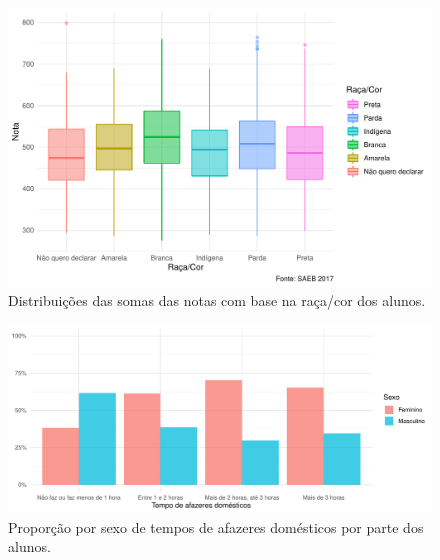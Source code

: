 \newpage

\begin{figure}[h]
    \caption{Distribuições das somas das notas com base na raça/cor dos alunos.}
    \begin{center}
        \includegraphics[width=16cm]{img/raca_cor_notas.pdf}
    \end{center}
\end{figure}

\newpage

\begin{figure}[h]
    \caption{Proporção por sexo de tempos de afazeres domésticos por parte
    dos alunos.}
    \begin{center}
        \includegraphics[width=16cm]{img/sexo_afazeres.pdf}
    \end{center}
\end{figure}
